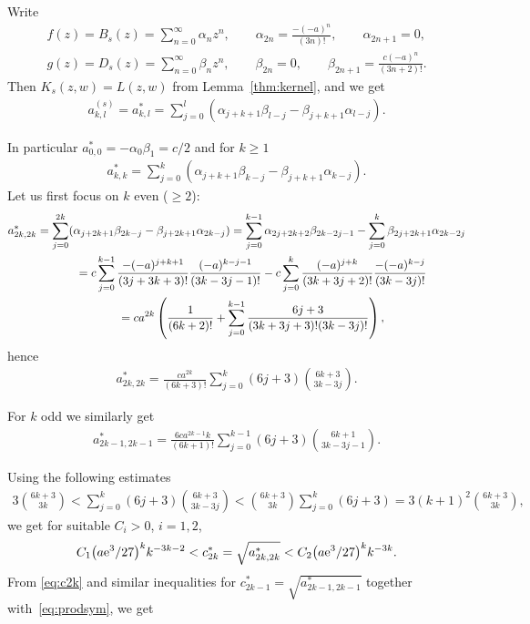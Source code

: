 \documentclass[pdftex]{sigma}
\numberwithin{equation}{section}
\begin{document}
Write
\begin{gather*}
f(z)=B_s(z)=\sum_{n=0}^\infty\alpha_n z^n,\qquad \alpha_{2n}=\frac{-(-a)^{n}}{(3n)!},\qquad \alpha_{2n+1}=0,\\
g(z)=D_s(z)= \sum_{n=0}^\infty\beta_nz^n,\qquad \beta_{2n}=0,\qquad \beta_{2n+1}=\frac{c(-a)^n}{(3n+2)!}.
\end{gather*}
Then $K_s(z,w)=L(z,w)$ from Lemma~\ref{thm:kernel}, and we get
\begin{gather*}
a_{k,l}^{(s)}=a_{k,l}^*=\sum_{j=0}^l (\alpha_{j+k+1}\beta_{l-j}-\beta_{j+k+1}\alpha_{l-j}).
\end{gather*}

In particular $a_{0,0}^*=-\alpha_0\beta_1=c/2$ and for $k\ge 1$
\begin{gather*}
a_{k,k}^*=\sum_{j=0}^k(\alpha_{j+k+1}\beta_{k-j}-\beta_{j+k+1}\alpha_{k-j}).
\end{gather*}
Let us first focus on $k$ even ($\ge 2$):
\begin{gather*}
a_{2k,2k}^* = \sum_{j=0}^{2k}(\alpha_{j+2k+1}\beta_{2k-j}-\beta_{j+2k+1}\alpha_{2k-j}) = \sum_{j=0}^{k-1} \alpha_{2j+2k+2}\beta_{2k-2j-1}-\sum_{j=0}^{k}\beta_{2j+2k+1}\alpha_{2k-2j}\\
\hphantom{a_{2k,2k}^*}{} = c\sum_{j=0}^{k-1} \frac{-(-a)^{j+k+1}}{(3j+3k+3)!}\frac{(-a)^{k-j-1}}{(3k-3j-1)!} -c\sum_{j=0}^{k} \frac{(-a)^{j+k}}{(3k+3j+2)!}\frac{-(-a)^{k-j}}{(3k-3j)!}\\
\hphantom{a_{2k,2k}^*}{}=c a^{2k}\left(\frac{1}{(6k+2)!}+\sum_{j=0}^{k-1}\frac{6j+3}{(3k+3j+3)!(3k-3j)!}\right),
\end{gather*}
hence
\begin{gather}\label{eq:even}
a_{2k,2k}^*=\frac{ca^{2k}}{(6k+3)!}\sum_{j=0}^k (6j+3)\binom{6k+3}{3k-3j}.
\end{gather}

For $k$ odd we similarly get
\begin{gather*}
a_{2k-1,2k-1}^*=\frac{6ca^{2k-1}k}{(6k+1)!}\sum_{j=0}^{k-1} (6j+3)\binom{6k+1}{3k-3j-1}.
\end{gather*}

Using the following estimates
\begin{gather*}
3\binom{6k+3}{3k} < \sum_{j=0}^k (6j+3)\binom{6k+3}{3k-3j} < \binom{6k+3}{3k}\sum_{j=0}^k (6j+3)=3(k+1)^2\binom{6k+3}{3k},
\end{gather*}
we get for suitable $C_i>0$, $i=1,2$,
\begin{gather}\label{eq:c2k}
C_1 \big(a {\rm e}^3/27\big)^k k^{-3k-2} <c_{2k}^*=\sqrt{a_{2k,2k}^*}< C_2 \big(a {\rm e}^3/27\big)^k k^{-3k}.
\end{gather}
From \eqref{eq:c2k} and similar inequalities for $c_{2k-1}^*=\sqrt{a_{2k-1,2k-1}^*}$ together with~\eqref{eq:prodsym}, we get
\end{document}
